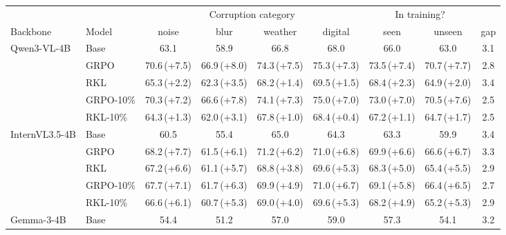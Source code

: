 \begin{table}[t]
\centering\small
\setlength{\tabcolsep}{5pt}
\begin{tabular}{llcccc|cc|c}
\toprule
& & \multicolumn{4}{c|}{Corruption category} & \multicolumn{2}{c|}{In training?} & \\
\cmidrule(lr){3-6}\cmidrule(lr){7-8}
Backbone & Model & noise & blur & weather & digital & seen & unseen & gap \\
\midrule
\multirow{5}{*}{Qwen3-VL-4B} & Base & 63.1 & 58.9 & 66.8 & 68.0 & 66.0 & 63.0 & 3.1 \\
 & GRPO & 70.6\,{\scriptsize(+7.5)} & 66.9\,{\scriptsize(+8.0)} & 74.3\,{\scriptsize(+7.5)} & 75.3\,{\scriptsize(+7.3)} & 73.5\,{\scriptsize(+7.4)} & 70.7\,{\scriptsize(+7.7)} & 2.8 \\
 & RKL & 65.3\,{\scriptsize(+2.2)} & 62.3\,{\scriptsize(+3.5)} & 68.2\,{\scriptsize(+1.4)} & 69.5\,{\scriptsize(+1.5)} & 68.4\,{\scriptsize(+2.3)} & 64.9\,{\scriptsize(+2.0)} & 3.4 \\
 & GRPO-10\% & 70.3\,{\scriptsize(+7.2)} & 66.6\,{\scriptsize(+7.8)} & 74.1\,{\scriptsize(+7.3)} & 75.0\,{\scriptsize(+7.0)} & 73.0\,{\scriptsize(+7.0)} & 70.5\,{\scriptsize(+7.6)} & 2.5 \\
 & RKL-10\% & 64.3\,{\scriptsize(+1.3)} & 62.0\,{\scriptsize(+3.1)} & 67.8\,{\scriptsize(+1.0)} & 68.4\,{\scriptsize(+0.4)} & 67.2\,{\scriptsize(+1.1)} & 64.7\,{\scriptsize(+1.7)} & 2.5 \\
\midrule
\multirow{5}{*}{InternVL3.5-4B} & Base & 60.5 & 55.4 & 65.0 & 64.3 & 63.3 & 59.9 & 3.4 \\
 & GRPO & 68.2\,{\scriptsize(+7.7)} & 61.5\,{\scriptsize(+6.1)} & 71.2\,{\scriptsize(+6.2)} & 71.0\,{\scriptsize(+6.8)} & 69.9\,{\scriptsize(+6.6)} & 66.6\,{\scriptsize(+6.7)} & 3.3 \\
 & RKL & 67.2\,{\scriptsize(+6.6)} & 61.1\,{\scriptsize(+5.7)} & 68.8\,{\scriptsize(+3.8)} & 69.6\,{\scriptsize(+5.3)} & 68.3\,{\scriptsize(+5.0)} & 65.4\,{\scriptsize(+5.5)} & 2.9 \\
 & GRPO-10\% & 67.7\,{\scriptsize(+7.1)} & 61.7\,{\scriptsize(+6.3)} & 69.9\,{\scriptsize(+4.9)} & 71.0\,{\scriptsize(+6.7)} & 69.1\,{\scriptsize(+5.8)} & 66.4\,{\scriptsize(+6.5)} & 2.7 \\
 & RKL-10\% & 66.6\,{\scriptsize(+6.1)} & 60.7\,{\scriptsize(+5.3)} & 69.0\,{\scriptsize(+4.0)} & 69.6\,{\scriptsize(+5.3)} & 68.2\,{\scriptsize(+4.9)} & 65.2\,{\scriptsize(+5.3)} & 2.9 \\
\midrule
\multirow{6}{*}{Gemma-3-4B} & Base & 54.4 & 51.2 & 57.0 & 59.0 & 57.3 & 54.1 & 3.2 \\

\end{tabular}
\end{table}
